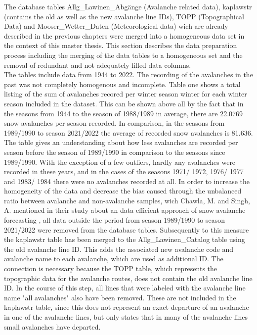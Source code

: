 \documentclass[../masterarbeit.tex]{subfiles}
\begin{document}
The database tables Allg\_Lawinen\_Abgänge (Avalanche related data), kaplawstr (contains the old as well as the new avalanche line IDs), TOPP (Topographical Data) and Mooser\_Wetter\_Daten (Meteorological data) wich are already described in the previous chapters were merged into a homogeneous data set in the context of this master thesis. This section describes the data preparation process including the merging of the data tables to a homogeneous set and the removal of redundant and not adequately filled data columns. \\
The tables include data from 1944 to 2022. The recording of the avalanches in the past was not completely homogenous and incomplete. Table one shows a total listing of the sum of avalanches recored per winter season winter for each winter season included in the dataset. This can be shown above all by the fact that in the seasons from 1944 to the season of 1988/1989 in average, there are 22.0769 snow avalanches per season recorded. In comparison, in the seasons from 1989/1990 to season 2021/2022 the average of recorded snow avalanches is 81.636. The table gives an understanding about how less avalanches are recorded per season before the season of 1989/1990 in comparison to the seasons since 1989/1990. With the exception of a few outliers, hardly any avalanches were recorded in these years, and in the cases of the seasons 1971/ 1972, 1976/ 1977 and 1983/ 1984 there were no avalanches recorded at all. In order to increase the homogeneity of the data and decrease the bias caused through the unbalanced ratio between avalanche and non-avalanche samples, wich Chawla, M. and Singh, A. mentioned in their study about an data efficient approach of snow avalanche forecasting \textcite[]{nhess-2021-106}, all data outside the period from season 1989/1990 to season 2021/2022 were removed from the database tables.
Subsequently to this measure the kaplawstr table has been merged to the Allg\_Lawinen\_Catalog table using the old avalanche line ID. This adds the associated new avalanche code and avalanche name to each avalanche, which are used as additional ID. The connection is necessary because the TOPP table, which represents the topographic data for the avalanche routes, does not contain the old avalanche line ID. In the course of this step, all lines that were labeled with the avalanche line name "all avalanches" also have been removed. These are not included in the kaplawstr table, since this does not represent an exact departure of an avalanche in one of the avalanche lines, but only states that in many of the avalanche lines small avalanches have departed. \\
\end{document}
